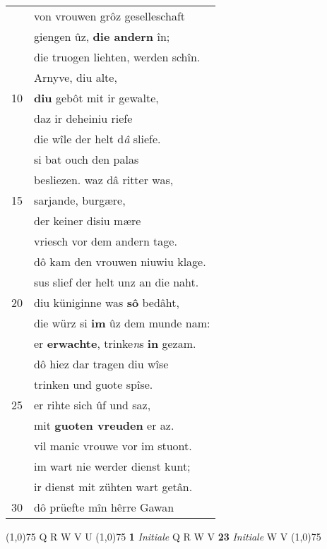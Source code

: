\documentclass[8pt,a4paper,notitlepage]{article}
\begin{document}
\begin{table}[ht]
\begin{minipage}[t]{0.5\linewidth}
\begin{tabular}{rl}
 & von vrouwen grôz geselleschaft\\ 
 & giengen ûz, \textbf{die andern} în;\\ 
 & die truogen liehten, werden schîn.\\ 
 & Arnyve, diu alte,\\ 
10 & \textbf{diu} gebôt mit ir gewalte,\\ 
 & daz ir deheiniu riefe\\ 
 & die wîle der helt d\textit{â} sliefe.\\ 
 & si bat ouch den palas\\ 
 & besliezen. waz dâ ritter was,\\ 
15 & sarjande, burgære,\\ 
 & der keiner disiu mære\\ 
 & vriesch vor dem andern tage.\\ 
 & dô kam den vrouwen niuwiu klage.\\ 
 & sus slief der helt unz an die naht.\\ 
20 & diu küniginne was \textbf{sô} bedâht,\\ 
 & die würz si \textbf{im} ûz dem munde nam:\\ 
 & er \textbf{erwachte}, trinke\textit{n}s \textbf{in} gezam.\\ 
 & dô hiez dar tragen diu wîse\\ 
 & trinken und guote spîse.\\ 
25 & er rihte sich ûf und saz,\\ 
 & mit \textbf{guoten vreuden} er az.\\ 
 & vil manic vrouwe vor im stuont.\\ 
 & im wart nie werder dienst kunt;\\ 
 & ir dienst mit zühten wart getân.\\ 
30 & dô prüefte mîn hêrre Gawan\\ 
\end{tabular}
\scriptsize
\line(1,0){75} \newline
Q R W V U \newline
\line(1,0){75} \newline
\textbf{1} \textit{Initiale} Q R W V  \textbf{23} \textit{Initiale} W V  \newline
\line(1,0){75} \newline

\end{minipage}
\end{table}
\end{document}
